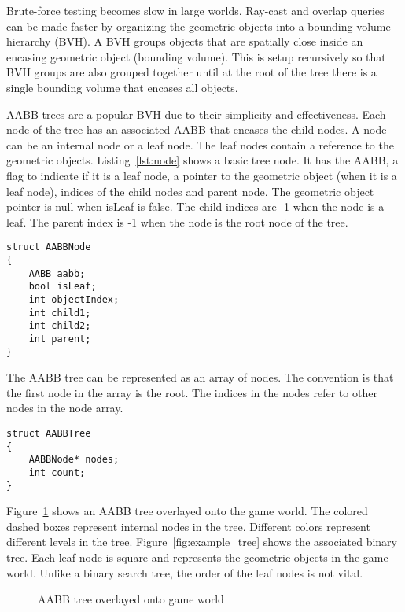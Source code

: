 \documentclass{article}
\begin{document}
Brute-force testing becomes slow in large worlds. Ray-cast and overlap queries can be made faster by organizing the geometric objects into a bounding volume hierarchy (BVH). A BVH groups objects that are spatially close inside an encasing geometric object (bounding volume). This is setup recursively so that BVH groups are also grouped together until at the root of the tree there is a single bounding volume that encases all objects.

AABB trees are a popular BVH due to their simplicity and effectiveness. Each node of the tree has an associated AABB that encases the child nodes. A node can be an internal node or a leaf node. The leaf nodes contain a reference to the geometric objects. Listing~\ref{lst:node} shows a basic tree node. It has the AABB, a flag to indicate if it is a leaf node, a pointer to the geometric object (when it is a leaf node), indices of the child nodes and parent node. The geometric object pointer is null when isLeaf is false. The child indices are -1 when the node is a leaf. The parent index is -1 when the node is the root node of the tree.
\begin{lstlisting}[caption={AABB tree node}, label={lst:node}, float]
struct AABBNode
{
	AABB aabb;
	bool isLeaf;
	int objectIndex;
	int child1;
	int child2;
	int parent;
}
\end{lstlisting}

The AABB tree can be represented as an array of nodes. The convention is that the first node in the array is the root. The indices in the nodes refer to other nodes in the node array.

\begin{lstlisting}[caption={AABB tree}, label={lst:tree}, float]
struct AABBTree
{
	AABBNode* nodes;
	int count;
}
\end{lstlisting}

Figure~\ref{fig:overlay} shows an AABB tree overlayed onto the game world. The colored dashed boxes represent internal nodes in the tree. Different colors represent different levels in the tree. Figure~\ref{fig:example_tree} shows the associated binary tree. Each leaf node is square and represents the geometric objects in the game world. Unlike a binary search tree, the order of the leaf nodes is not vital.
\begin{figure}
	\begin{center}
		
	\end{center}
	\caption{AABB tree overlayed onto game world}
	\label{fig:overlay}
\end{figure}
\end{document}

